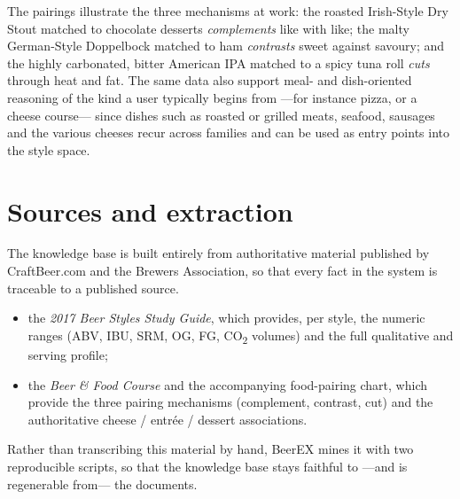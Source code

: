 The pairings illustrate the three mechanisms at work: the roasted Irish-Style Dry
Stout matched to chocolate desserts \emph{complements} like with like; the malty
German-Style Doppelbock matched to ham \emph{contrasts} sweet against savoury;
and the highly carbonated, bitter American IPA matched to a spicy tuna roll
\emph{cuts} through heat and fat. The same data also support meal- and
dish-oriented reasoning of the kind a user typically begins from ---for instance
pizza, or a cheese course--- since dishes such as roasted or grilled meats,
seafood, sausages and the various cheeses recur across families and can be used
as entry points into the style space.

\section{Sources and extraction}

The knowledge base is built entirely from authoritative material published by
CraftBeer.com and the Brewers Association, so that every fact in the system is
traceable to a published source.

\begin{itemize}[leftmargin=2em]
  \item the \emph{2017 Beer Styles Study Guide}, which provides, per style, the
        numeric ranges (ABV, IBU, SRM, OG, FG, CO\textsubscript{2} volumes) and
        the full qualitative and serving profile;
  \item the \emph{Beer \& Food Course} and the accompanying food-pairing chart,
        which provide the three pairing mechanisms (complement, contrast, cut)
        and the authoritative cheese / entrée / dessert associations.
\end{itemize}

Rather than transcribing this material by hand, BeerEX mines it with two
reproducible scripts, so that the knowledge base stays faithful to ---and is
regenerable from--- the documents.

